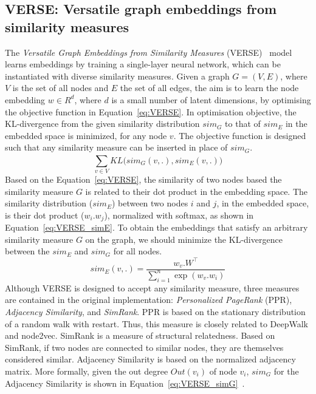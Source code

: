 \subsection{VERSE: Versatile graph embeddings from similarity measures}
\label{subsec:VERSE}
The \emph{Versatile Graph Embeddings from Similarity Measures} (VERSE)~ model learns embeddings by training a single-layer neural network, which can be instantiated with diverse similarity measures. Given a graph $G=(V,E)$, where $V$ is the set of all nodes and $E$ the set of all edges, the aim is to learn the node embedding $w \in R^{d}$, where $d$ is a small number of latent dimensions, by optimising the objective function in Equation~\ref{eq:VERSE}. In optimisation objective, the KL-divergence from the given similarity distribution $sim_G$ to that of $sim_E$ in the embedded space is minimized, for any node $v$. The objective function is designed such that any similarity measure can be inserted in place of $sim_G$. 
\begin{equation}
\sum _{ v\in V }^{  }{ KL(sim_{ G }(v,.),sim_{ E } } (v,.))
\label{eq:VERSE}
\end{equation}
Based on the Equation~\ref{eq:VERSE}, the similarity of two nodes based the similarity measure $G$ is related to their dot product in the embedding space. The similarity distribution ($sim_E$) between two nodes $i$ and $j$, in the embedded space, is their dot product ($w_i . w_j$), normalized with softmax, as shown in Equation~\ref{eq:VERSE_simE}. To obtain the embeddings that satisfy an arbitrary similarity measure $G$ on the graph, we should minimize the KL-divergence between the $sim_{ E }$ and $sim_{G}$ for all nodes. 
\begin{equation}
sim_{ E }(v,.)=\frac{ w_{ v }.W^\top }{ \sum _{ i=1 }^{ n }{ \exp{(w_{ v }.w_{ i }) }}  }\label{eq:VERSE_simE}
\end{equation}
Although VERSE is designed to accept any similarity measure, three measures are contained in the original implementation: \emph{Personalized PageRank} (PPR),  \emph{Adjacency Similarity}, and  \emph{SimRank}. PPR is based on the stationary distribution of a random walk with restart. Thus, this measure is closely related to DeepWalk and node2vec. SimRank is a measure of structural relatedness. Based on SimRank, if two nodes are connected to similar nodes, they are themselves considered similar. Adjacency Similarity is based on the normalized adjacency matrix. More formally, given the out degree $Out(v_{i})$ of node $v_{i}$, $sim_{ G }$ for the Adjacency Similarity is shown in Equation~\ref{eq:VERSE_simG}~. 
